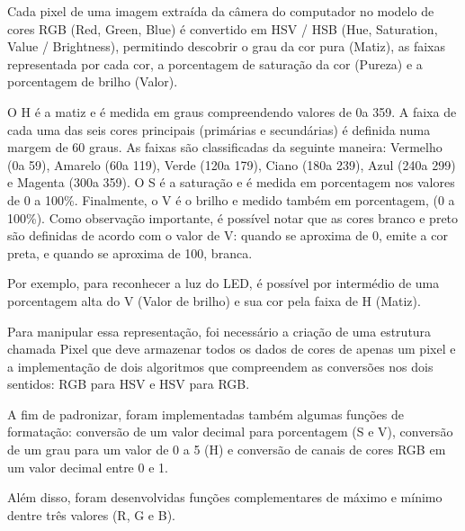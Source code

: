 \documentclass[12pt]{article}
\begin{document}
Cada pixel de uma imagem extra\'ida da c\^amera do computador no modelo de cores RGB (Red, Green, Blue) \'e convertido em
HSV / HSB (Hue, Saturation, Value / Brightness), permitindo descobrir o grau da cor pura (Matiz), as faixas representada por cada cor,
a porcentagem de satura\c c\~ao da cor (Pureza) e a porcentagem de brilho (Valor).

O H \'e a matiz e \'e medida em graus compreendendo valores de 0\degree a 359\degree.
A faixa de cada uma das seis cores principais (prim\'arias e secund\'arias) \'e definida numa margem de 60 graus.
As faixas s\~ao classificadas da seguinte maneira: Vermelho (0\degree a 59\degree), Amarelo (60\degree a 119\degree), Verde (120\degree a 179\degree),
Ciano (180\degree a 239\degree), Azul (240\degree a 299\degree) e Magenta (300\degree a 359\degree).
O S \'e a satura\c c\~ao e \'e medida em porcentagem nos valores de 0 a 100\%.
Finalmente, o V \'e o brilho e medido tamb\'em em porcentagem, (0 a 100\%). Como observa\c c\~ao importante, \'e possível notar
que as cores branco e preto s\~ao definidas de acordo com o valor de V: quando se aproxima de 0, emite a cor preta,
e quando se aproxima de 100, branca.

Por exemplo, para reconhecer a luz do LED, \'e poss\'ivel por interm\'edio de uma porcentagem alta
do V (Valor de brilho) e sua cor pela faixa de H (Matiz).

Para manipular essa representa\c c\~ao, foi necess\'ario a cria\c c\~ao de uma estrutura chamada Pixel
que deve armazenar todos os dados de cores de apenas um pixel e a implementa\c c\~ao de dois algoritmos
que compreendem as convers\~oes nos dois sentidos: RGB para HSV e HSV para RGB.

A fim de padronizar, foram implementadas tamb\'em algumas fun\c c\~oes de formata\c c\~ao: convers\~ao de
um valor decimal para porcentagem (S e V), convers\~ao de um grau para um valor de 0 a 5 (H) e convers\~ao
de canais de cores RGB em um valor decimal entre 0 e 1.

Al\'em disso, foram desenvolvidas fun\c c\~oes complementares de m\'aximo e m\'inimo dentre tr\^es valores (R, G e B).
\end{document}
